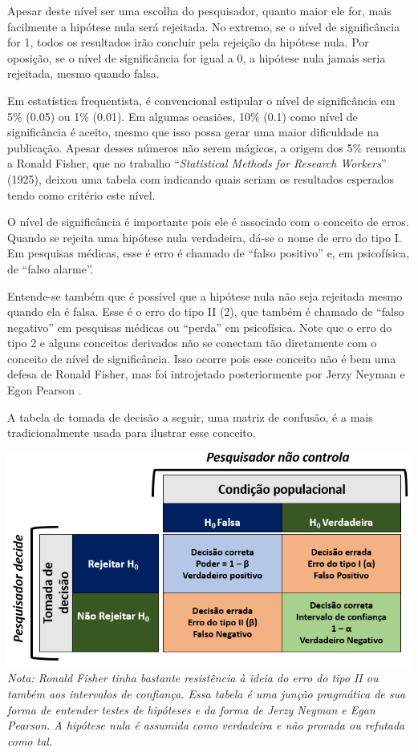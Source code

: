 \documentclass[
]{book}
\begin{document}
Apesar deste nível ser uma escolha do pesquisador, quanto maior ele for, mais facilmente a hipótese nula será rejeitada. No extremo, se o nível de significância for 1, todos os resultados irão concluir pela rejeição da hipótese nula. Por oposição, se o nível de significância for igual a 0, a hipótese nula jamais seria rejeitada, mesmo quando falsa.

Em estatística frequentista, é convencional estipular o nível de significância em 5\% (0.05) ou 1\% (0.01). Em algumas ocasiões, 10\% (0.1) como nível de significância é aceito, mesmo que isso possa gerar uma maior dificuldade na publicação. Apesar desses números não serem mágicos, a origem dos 5\% remonta a Ronald Fisher, que no trabalho ``\emph{Statistical Methods for Research Workers}'' (1925), deixou uma tabela com indicando quais seriam os resultados esperados tendo como critério este nível.

O nível de significância é importante pois ele é associado com o conceito de erros. Quando se rejeita uma hipótese nula verdadeira, dá-se o nome de erro do tipo I. Em pesquisas médicas, esse é erro é chamado de ``falso positivo'' e, em psicofísica, de ``falso alarme''.

Entende-se também que é possível que a hipótese nula não seja rejeitada mesmo quando ela é falsa. Esse é o erro do tipo II (2), que também é chamado de ``falso negativo'' em pesquisas médicas ou ``perda'' em psicofísica. Note que o erro do tipo 2 e alguns conceitos derivados não se conectam tão diretamente com o conceito de nível de significância. Isso ocorre pois esse conceito não é bem uma defesa de Ronald Fisher, mas foi introjetado posteriormente por Jerzy Neyman e Egon Pearson \citep{cohen2013explaining}.

A tabela de tomada de decisão a seguir, uma matriz de confusão, é a mais tradicionalmente usada para ilustrar esse conceito.

\includegraphics{./img/cap_inferencia_tabela_decisao.png}
\emph{Nota: Ronald Fisher tinha bastante resistência à ideia do erro do tipo II ou também aos intervalos de confiança. Essa tabela é uma junção pragmática de sua forma de entender testes de hipóteses e da forma de Jerzy Neyman e Egan Pearson. A hipótese nula é assumida como verdadeira e não provada ou refutada como tal.}
\end{document}
